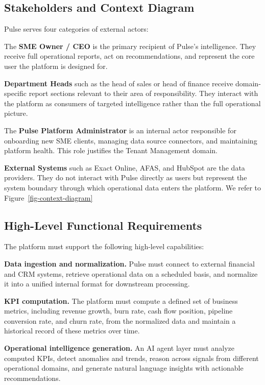 \documentclass[
  letterpaper,
  DIV=11,
  numbers=noendperiod]{scrartcl}
\begin{document}
\subsection{\texorpdfstring{\textbf{Stakeholders and Context
Diagram}}{Stakeholders and Context Diagram}}\label{stakeholders-and-context-diagram}

Pulse serves four categories of external actors:

The \textbf{SME Owner / CEO} is the primary recipient of Pulse's
intelligence. They receive full operational reports, act on
recommendations, and represent the core user the platform is designed
for.

\textbf{Department Heads} such as the head of sales or head of finance
receive domain-specific report sections relevant to their area of
responsibility. They interact with the platform as consumers of targeted
intelligence rather than the full operational picture.

The \textbf{Pulse Platform Administrator} is an internal actor
responsible for onboarding new SME clients, managing data source
connectors, and maintaining platform health. This role justifies the
Tenant Management domain.

\textbf{External Systems} such as Exact Online, AFAS, and HubSpot are
the data providers. They do not interact with Pulse directly as users
but represent the system boundary through which operational data enters
the platform. We refer to Figure~\ref{fig-context-diagram}

\subsection{\texorpdfstring{\textbf{High-Level Functional
Requirements}}{High-Level Functional Requirements}}\label{high-level-functional-requirements}

The platform must support the following high-level capabilities:

\textbf{Data ingestion and normalization.} Pulse must connect to
external financial and CRM systems, retrieve operational data on a
scheduled basis, and normalize it into a unified internal format for
downstream processing.

\textbf{KPI computation.} The platform must compute a defined set of
business metrics, including revenue growth, burn rate, cash flow
position, pipeline conversion rate, and churn rate, from the normalized
data and maintain a historical record of these metrics over time.

\textbf{Operational intelligence generation.} An AI agent layer must
analyze computed KPIs, detect anomalies and trends, reason across
signals from different operational domains, and generate natural
language insights with actionable recommendations.
\end{document}
